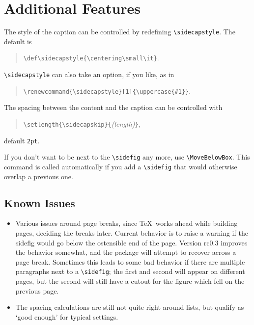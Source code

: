 \documentclass{article}
\begin{document}
	
	\section*{Additional Features}

	\renewcommand{\sidecapstyle}[1]{\uppercase{#1}}
	The style of the caption can be controlled by redefining \verb|\sidecapstyle|.
	The default is
	\begin{quote}
		\verb|\def\sidecapstyle{\centering\small\it}|.
	\end{quote}
	\verb|\sidecapstyle| can also take an option, if you like, as in
	\begin{quote}
		\verb|\renewcommand{\sidecapstyle}[1]{\uppercase{#1}}|.
	\end{quote}
	
	
	The spacing between the content and the caption can be controlled with
	\begin{quote}
		\verb|\setlength{\sidecapskip}{|\emph{(length)}\verb|}|,
	\end{quote}
	default \verb|2pt|.
	
	If you don't want to be next to the \verb|\sidefig| any more, use \verb|\MoveBelowBox|.
	This command is called automatically if you add a \verb|\sidefig| that would otherwise overlap a previous one.
	
	\subsection*{Known Issues}
	
	\begin{itemize}
		\item Various issues around page breaks, since \TeX\ works ahead while building pages, deciding the breaks later.
		Current behavior is to raise a warning if the sidefig would go below the ostensible end of the page.
		Version rc0.3 improves the behavior somewhat, and the package will attempt to recover across a page break.
		Sometimes this leads to some bad behavior if there are multiple paragraphs next to a \verb|\sidefig|; the first and second will appear on different pages, but the second will still have a cutout for the figure which fell on the previous page.

		\item The spacing calculations are still not quite right around lists, but qualify as `good enough' for typical settings.
	\end{itemize}
	
\end{document}
